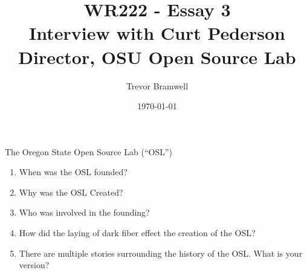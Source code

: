 \documentclass[12pt]{article}
\title{WR222 - Essay 3\\
    Interview with Curt Pederson\\ 
    Director, OSU Open Source Lab
}
\author{
    Trevor Bramwell \\
}
\date{\today}
\begin{document}
\maketitle

The Oregon State Open Source Lab (``OSL'')

\begin{enumerate} \itemsep150pt
    \item When was the OSL founded?
    \item Why was the OSL Created?
    \item Who was involved in the founding?
    \item How did the laying of dark fiber effect the creation of the OSL?
    \item There are multiple stories surrounding the history of the OSL. What
          is your version?
\end{enumerate}
\end{document}
